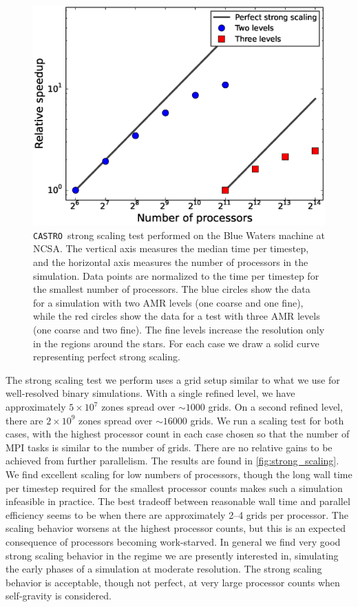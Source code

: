 \documentclass[iop]{../emulateapj}
\newcommand{\castro}{\texttt{CASTRO}}
\begin{document}
\begin{figure}
  \centering
  \includegraphics[scale=0.4]{plots/strong_scaling}
  \caption{\castro\ strong scaling test performed on the Blue Waters machine at
    NCSA. The vertical axis measures the median time per timestep, and the 
    horizontal axis measures the number of processors in the simulation. Data 
    points are normalized to the time per timestep for the smallest number 
    of processors. The blue circles show the data for a simulation with two AMR
    levels (one coarse and one fine), while the red circles show the data 
    for a test with three AMR levels (one coarse and two fine). The fine levels 
    increase the resolution only in the regions around the stars. For each case 
    we draw a solid curve representing perfect strong scaling.\label{fig:strong_scaling}}
\end{figure}

The strong scaling test we perform uses a grid setup similar to what we 
use for well-resolved binary simulations. With a single refined level, 
we have approximately $5 \times 10^7$ zones spread over $\sim 1000$ grids.
On a second refined level, there are $2 \times 10^9$ zones spread over 
$\sim 16000$ grids. We run a scaling test for both cases, with the 
highest processor count in each case chosen so that the number of 
MPI tasks is similar to the number of grids. There are no relative gains 
to be achieved from further parallelism. The results are found in 
\autoref{fig:strong_scaling}. We find excellent scaling for low numbers 
of processors, though the long wall time per timestep required for the 
smallest processor counts makes such a simulation infeasible in practice.
The best tradeoff between reasonable wall time and parallel efficiency 
seems to be when there are approximately 2--4 grids per processor. The 
scaling behavior worsens at the highest processor counts, but this is 
an expected consequence of processors becoming work-starved. In general 
we find very good strong scaling behavior in the regime we are presently 
interested in, simulating the early phases of a simulation at moderate 
resolution. The strong scaling behavior is acceptable, though not perfect, 
at very large processor counts when self-gravity is considered.
\end{document}

